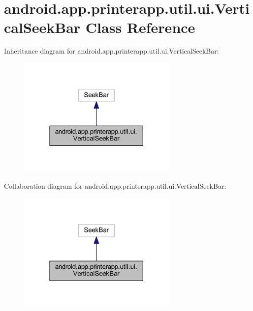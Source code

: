 \hypertarget{classandroid_1_1app_1_1printerapp_1_1util_1_1ui_1_1_vertical_seek_bar}{}\section{android.\+app.\+printerapp.\+util.\+ui.\+Vertical\+Seek\+Bar Class Reference}
\label{classandroid_1_1app_1_1printerapp_1_1util_1_1ui_1_1_vertical_seek_bar}


Inheritance diagram for android.\+app.\+printerapp.\+util.\+ui.\+Vertical\+Seek\+Bar\+:
\nopagebreak
\begin{figure}[H]
\begin{center}
\leavevmode
\includegraphics[width=222pt]{classandroid_1_1app_1_1printerapp_1_1util_1_1ui_1_1_vertical_seek_bar__inherit__graph}
\end{center}
\end{figure}


Collaboration diagram for android.\+app.\+printerapp.\+util.\+ui.\+Vertical\+Seek\+Bar\+:
\nopagebreak
\begin{figure}[H]
\begin{center}
\leavevmode
\includegraphics[width=222pt]{classandroid_1_1app_1_1printerapp_1_1util_1_1ui_1_1_vertical_seek_bar__coll__graph}
\end{center}
\end{figure}
